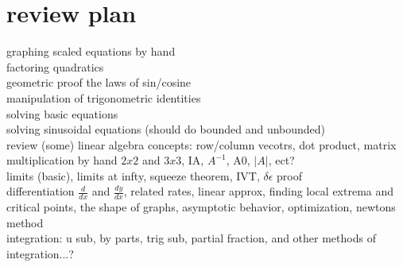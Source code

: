 \documentclass{article}
\begin{document}
\section*{review plan}
graphing scaled equations by hand\\
factoring quadratics\\
geometric proof the laws of sin/cosine\\
manipulation of trigonometric identities\\
solving basic equations\\
solving sinusoidal equations (should do bounded and unbounded)\\
review (some) linear algebra concepts: row/column vecotrs, dot product, matrix multiplication by hand $2x2$ and $3x3$, IA, $A^{-1}$, A0, $\lvert A\rvert$, ect?\\
limits (basic), limits at infty, squeeze theorem, IVT, $\delta \epsilon$ proof\\
differentiation $\frac{d}{dx}$ and $\frac{dy}{dx}$, related rates, linear approx, finding local extrema and critical points, the shape of graphs, asymptotic behavior, optimization, newtons method\\
integration: u sub, by parts, trig sub, partial fraction, and other methods of integration...?
\end{document}
